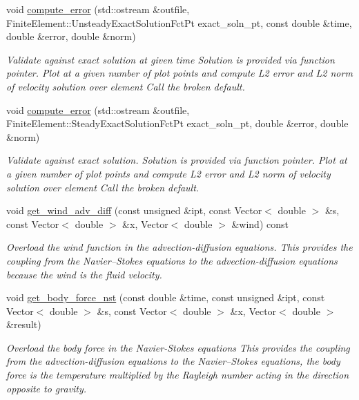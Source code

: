 \begin{DoxyCompactItemize}
void \hyperlink{classoomph_1_1BuoyantQCrouzeixRaviartElement_a53d343548b707c62e9f11a04d2dda986}{compute\+\_\+error} (std\+::ostream \&outfile, Finite\+Element\+::\+Unsteady\+Exact\+Solution\+Fct\+Pt exact\+\_\+soln\+\_\+pt, const double \&time, double \&error, double \&norm)
\begin{DoxyCompactList}\small\item\em Validate against exact solution at given time Solution is provided via function pointer. Plot at a given number of plot points and compute L2 error and L2 norm of velocity solution over element Call the broken default. \end{DoxyCompactList}\item 
void \hyperlink{classoomph_1_1BuoyantQCrouzeixRaviartElement_a2aa63b1b2ec1130835ee87cbf52cc086}{compute\+\_\+error} (std\+::ostream \&outfile, Finite\+Element\+::\+Steady\+Exact\+Solution\+Fct\+Pt exact\+\_\+soln\+\_\+pt, double \&error, double \&norm)
\begin{DoxyCompactList}\small\item\em Validate against exact solution. Solution is provided via function pointer. Plot at a given number of plot points and compute L2 error and L2 norm of velocity solution over element Call the broken default. \end{DoxyCompactList}\item 
void \hyperlink{classoomph_1_1BuoyantQCrouzeixRaviartElement_ade5820ae7c44a9371dcc348ca5a3ab1c}{get\+\_\+wind\+\_\+adv\+\_\+diff} (const unsigned \&ipt, const Vector$<$ double $>$ \&s, const Vector$<$ double $>$ \&x, Vector$<$ double $>$ \&wind) const
\begin{DoxyCompactList}\small\item\em Overload the wind function in the advection-\/diffusion equations. This provides the coupling from the Navier--Stokes equations to the advection-\/diffusion equations because the wind is the fluid velocity. \end{DoxyCompactList}\item 
void \hyperlink{classoomph_1_1BuoyantQCrouzeixRaviartElement_aeeef7868070fd692b33e5afa811af1da}{get\+\_\+body\+\_\+force\+\_\+nst} (const double \&time, const unsigned \&ipt, const Vector$<$ double $>$ \&s, const Vector$<$ double $>$ \&x, Vector$<$ double $>$ \&result)
\begin{DoxyCompactList}\small\item\em Overload the body force in the Navier-\/\+Stokes equations This provides the coupling from the advection-\/diffusion equations to the Navier--Stokes equations, the body force is the temperature multiplied by the Rayleigh number acting in the direction opposite to gravity. \end{DoxyCompactList}\item 

\end{DoxyCompactItemize}
